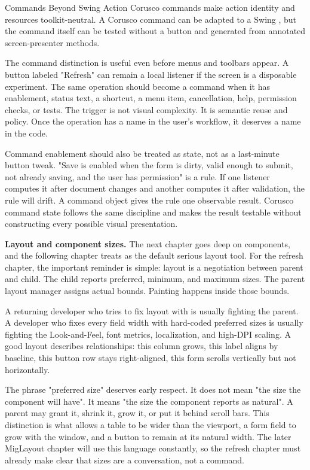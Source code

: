 \begin{coruscobox}{Commands Beyond Swing Action}
Corusco commands make action identity and resources toolkit-neutral. A Corusco command can be adapted to a Swing , but the command itself can be tested without a button and generated from annotated screen-presenter methods.
\end{coruscobox}

The command distinction is useful even before menus and toolbars appear. A button labeled "Refresh" can remain a local listener if the screen is a disposable experiment. The same operation should become a command when it has enablement, status text, a shortcut, a menu item, cancellation, help, permission checks, or tests. The trigger is not visual complexity. It is semantic reuse and policy. Once the operation has a name in the user's workflow, it deserves a name in the code.

Command enablement should also be treated as state, not as a last-minute button tweak. "Save is enabled when the form is dirty, valid enough to submit, not already saving, and the user has permission" is a rule. If one listener computes it after document changes and another computes it after validation, the rule will drift. A command object gives the rule one observable result. Corusco command state follows the same discipline and makes the result testable without constructing every possible visual presentation.

\textbf{Layout and component sizes.} The next chapter goes deep on components, and the following chapter treats \miglayout{} as the default serious layout tool. For the refresh chapter, the important reminder is simple: layout is a negotiation between parent and child. The child reports preferred, minimum, and maximum sizes. The parent layout manager assigns actual bounds. Painting happens inside those bounds.

A returning developer who tries to fix layout with  is usually fighting the parent. A developer who fixes every field width with hard-coded preferred sizes is usually fighting the Look-and-Feel, font metrics, localization, and high-DPI scaling. A good layout describes relationships: this column grows, this label aligns by baseline, this button row stays right-aligned, this form scrolls vertically but not horizontally.

The phrase "preferred size" deserves early respect. It does not mean "the size the component will have". It means "the size the component reports as natural". A parent may grant it, shrink it, grow it, or put it behind scroll bars. This distinction is what allows a table to be wider than the viewport, a form field to grow with the window, and a button to remain at its natural width. The later MigLayout chapter will use this language constantly, so the refresh chapter must already make clear that sizes are a conversation, not a command.

